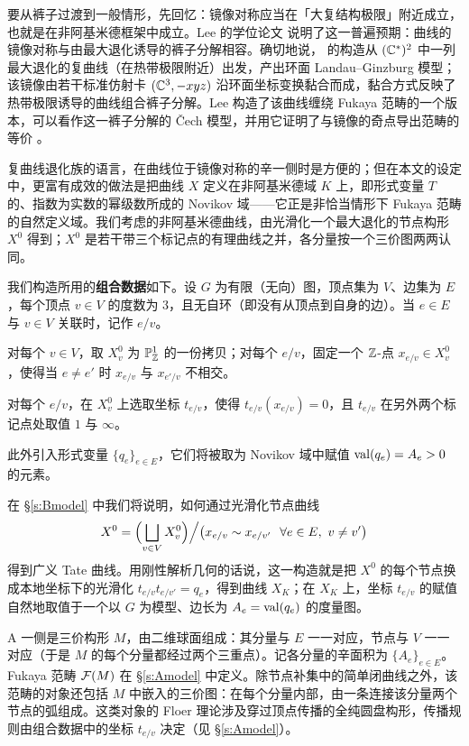 要从裤子过渡到一般情形，先回忆：镜像对称应当在「大复结构极限」附近成立，也就是在非阿基米德框架中成立。Lee 的学位论文 \cite{Lee} 说明了这一普遍预期：曲线的镜像对称与由最大退化诱导的裤子分解相容。确切地说，\cite{AAK} 的构造从 $(\mathbb{C}^*)^2$ 中一列最大退化的复曲线（在热带极限附近）出发，产出环面 Landau--Ginzburg 模型；该镜像由若干标准仿射卡 $(\mathbb{C}^3,-xyz)$ 沿环面坐标变换黏合而成，黏合方式反映了热带极限诱导的曲线组合裤子分解。Lee 构造了该曲线缠绕 Fukaya 范畴的一个版本，可以看作这一裤子分解的 \v Cech 模型，并用它证明了与镜像的奇点导出范畴的等价 \cite{Lee}。

复曲线退化族的语言，在曲线位于镜像对称的辛一侧时是方便的；但在本文的设定中，更富有成效的做法是把曲线 $X$ 定义在非阿基米德域 $K$ 上，即形式变量 $T$ 的、指数为实数的幂级数所成的 Novikov 域——它正是非恰当情形下 Fukaya 范畴的自然定义域。我们考虑的非阿基米德曲线，由光滑化一个最大退化的节点构形 $X^0$ 得到；$X^0$ 是若干带三个标记点的有理曲线之并，各分量按一个三价图两两认同。

\begin{defi}\label{def:combidata}
我们构造所用的\textbf{组合数据}如下。设 $G$ 为有限（无向）图，顶点集为 $V$、边集为 $E$，每个顶点 $v\in V$ 的度数为 $3$，且无自环（即没有从顶点到自身的边）。当 $e\in E$ 与 $v\in V$ 关联时，记作 $e/v$。

对每个 $v\in V$，取 $X^0_v$ 为 $\mathbb{P}^1_{\mathbb{Z}}$ 的一份拷贝；对每个 $e/v$，固定一个 $\mathbb{Z}$-点 $x_{e/v}\in X^0_v$，使得当 $e\ne e'$ 时 $x_{e/v}$ 与 $x_{e'/v}$ 不相交。

对每个 $e/v$，在 $X^0_v$ 上选取坐标 $t_{e/v}$，使得 $t_{e/v}(x_{e/v})=0$，且 $t_{e/v}$ 在另外两个标记点处取值 $1$ 与 $\infty$。

此外引入形式变量 $\{q_e\}_{e\in E}$，它们将被取为 Novikov 域中赋值 $\operatorname{val}(q_e)=A_e>0$ 的元素。
\end{defi}

在 §\ref{s:Bmodel} 中我们将说明，如何通过光滑化节点曲线
\[
X^0=\Bigl(\bigsqcup_{v\in V}X^0_v\Bigr)\Big/\bigl(x_{e/v}\sim x_{e/v'}\ \ \forall e\in E,\ v\ne v'\bigr)
\]
得到广义 Tate 曲线。用刚性解析几何的话说，这一构造就是把 $X^0$ 的每个节点换成本地坐标下的光滑化 $t_{e/v}t_{e/v'}=q_e$，得到曲线 $X_K$；在 $X_K$ 上，坐标 $t_{e/v}$ 的赋值自然地取值于一个以 $G$ 为模型、边长为 $A_e=\operatorname{val}(q_e)$ 的度量图。

A 一侧是三价构形 $M$，由二维球面组成：其分量与 $E$ 一一对应，节点与 $V$ 一一对应（于是 $M$ 的每个分量都经过两个三重点）。记各分量的辛面积为 $\{A_e\}_{e\in E}$。Fukaya 范畴 $\mathcal{F}(M)$ 在 §\ref{s:Amodel} 中定义。除节点补集中的简单闭曲线之外，该范畴的对象还包括 $M$ 中嵌入的三价图：在每个分量内部，由一条连接该分量两个节点的弧组成。这类对象的 Floer 理论涉及穿过顶点传播的全纯圆盘构形，传播规则由组合数据中的坐标 $t_{e/v}$ 决定（见 §\ref{s:Amodel}）。

